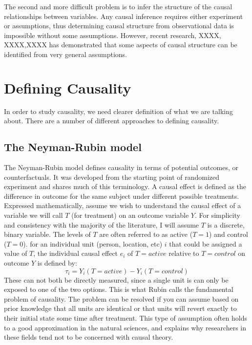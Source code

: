 \documentclass[11pt,a4paper]{article}
\begin{document}
The second and more difficult problem is to infer the structure of the causal relationships between variables. Any causal inference requires either experiment or assumptions, thus determining causal structure from observational data is impossible without some assumptions. However, recent research, XXXX, XXXX,XXXX has demonstrated that some aspects of causal structure can be identified from very general assumptions.


\section*{Defining Causality}

In order to study causality, we need clearer definition of what we are talking about. There are a number of different approaches to defining causality. 

\subsection*{The Neyman-Rubin model}


The Neyman-Rubin model defines causality in terms of potential outcomes, or counterfactuals. It was developed from the starting point of randomized experiment and shares much of this terminology. A causal effect is defined as the difference in outcome for the same subject under different possible treatments. Expressed mathematically, assume we wish to understand the causal effect of a variable we will call $T$ (for treatment) on an outcome variable $Y$. For simplicity and consistency with the majority of the literature, I will assume $T$ is a discrete, binary variable. The levels of $T$ are often referred to as active ($T=1$) and control ($T=0$). for an individual unit (person, location, etc) $i$  that could be assigned a value of $T$, the individual causal effect $e_{i}$ of $T=active$ relative to $T=control$ on outcome $Y$ is defined by:
\begin{equation}
\label{eq:ICE}
\tau_{i} = Y_{i}(T=active)-Y_{i}(T=control)
\end{equation}
These can not both be directly measured, since a single unit is can only be exposed to one of the two options. This is what Rubin calls the fundamental problem of causality. The problem can be resolved if you can assume based on prior knowledge that all units are identical or that units will revert exactly to their initial state some time after treatment. This type of assumption often holds to a good approximation in the natural sciences, and explains why researchers in these fields tend not to be concerned with causal theory.  
\end{document}
